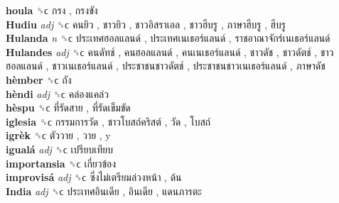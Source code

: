 \textbf{houla} ␝ϲ   กรง ,  กรงขัง   \\
\textbf{Hudiu} \emph{adj}  ␝ϲ   คนยิว ,  ชาวยิว ,  ชาวอิสราเอล ,  ชาวฮีบรู ,  ภาษาฮีบรู ,  ฮีบรู   \\
\textbf{Hulanda} \emph{n}  ␝ϲ   ประเทศฮอลแลนด์ ,  ประเทศเนเธอร์แลนด์ ,  ราชอาณาจักร์เนเธอร์แลนด์   \\
\textbf{Hulandes} \emph{adj}  ␝ϲ   คนดัทช์ ,  คนฮอลแลนด์ ,  คนเนเธอร์แลนด์ ,  ชาวดัช ,  ชาวดัตช์ ,  ชาวฮอลแลนด์ ,  ชาวเนเธอร์แลนด์ ,  ประชาชนชาวดัตช์ ,  ประชาชนชาวเนเธอร์แลนด์ ,  ภาษาดัช   \\
\textbf{hèmber} ␝ϲ   ถัง   \\
\textbf{hèndi} \emph{adj}  ␝ϲ   คล่องแคล่ว   \\
\textbf{hèspu} ␝ϲ   ที่รัดสาย ,  ที่รัดเข็มขัด   \\
\textbf{iglesia} ␝ϲ   กรรมการวัด ,  ชาวโบสถ์คริสต์ ,  วัด ,  โบสถ์   \\
\textbf{igrèk} ␝ϲ   ตัววาย ,  วาย , y  \\
\textbf{igualá} \emph{adj}  ␝ϲ   เปรียบเทียบ   \\
\textbf{importansia} ␝ϲ   เกี่ยวข้อง   \\
\textbf{improvisá} \emph{adj}  ␝ϲ   ซึ่งไม่เตรียมล่วงหน้า ,  ด้น   \\
\textbf{India} \emph{adj}  ␝ϲ   ประเทศอินเดีย ,  อินเดีย ,  แดนภารตะ   \\
